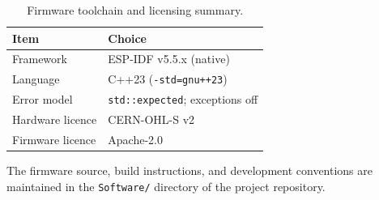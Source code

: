 \begin{table}[htbp]
  \centering
  \begin{tabular}{@{}L{4.2cm}L{9.2cm}@{}}
    \toprule
    \textbf{Item} & \textbf{Choice} \\
    \midrule
    Framework        & ESP-IDF v5.5.x (native) \\
    Language          & C++23 (\texttt{-std=gnu++23}) \\
    Error model       & \texttt{std::expected}; exceptions off \\
    Hardware licence  & CERN-OHL-S v2 \\
    Firmware licence  & Apache-2.0 \\
    \bottomrule
  \end{tabular}
  \caption{Firmware toolchain and licensing summary.}
  \label{tab:fw-toolchain}
\end{table}

The firmware source, build instructions, and development conventions are
maintained in the \texttt{Software/} directory of the project
repository.
